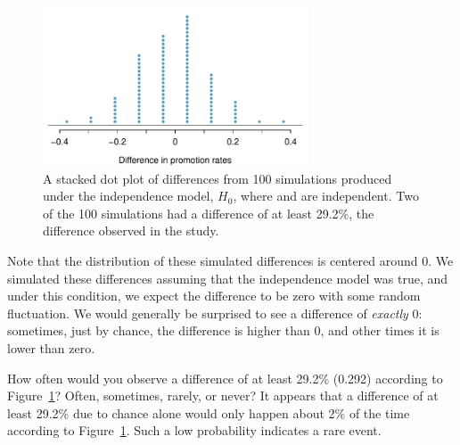 \begin{figure}[ht]
\centering
\includegraphics[width=0.7\textwidth]{ch_intro_to_data/figures/discRandDotPlot/discRandDotPlot}
\caption{A stacked dot plot of differences from 100 simulations produced under the independence model, $H_0$, where  and  are independent. Two of the 100 simulations had a difference of at least 29.2\%, the difference observed in the study.}
\label{discRandDotPlot}
\end{figure}

Note that the distribution of these simulated differences is centered around 0. We simulated these differences assuming that the independence model was true, and under this condition, we expect the difference to be zero with some random fluctuation. We would generally be surprised to see a difference of \emph{exactly} 0: sometimes, just by chance, the difference is higher than 0, and other times it is lower than zero.

\begin{example}{How often would you observe a difference of at least 29.2\% (0.292) according to Figure~\ref{discRandDotPlot}? Often, sometimes, rarely, or never?}
It appears that a difference of at least 29.2\% due to chance alone would only happen about 2\% of the time according to Figure~\ref{discRandDotPlot}. Such a low probability indicates a rare event.
\end{example}

